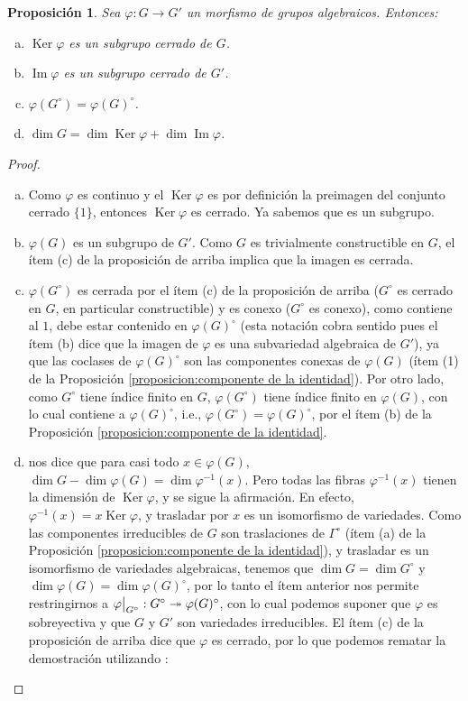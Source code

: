 \documentclass[spanish,10pt]{amsart}
\newcommand{\G}{\Gamma}
\newtheorem{proposition}[theorem]{Proposición}
\theoremstyle{definition}
\theoremstyle{remark}
\numberwithin{equation}{section}
\newcommand{\Imagen}{\operatorname{Im}}
\newcommand{\Ker}{\operatorname{Ker}}
\newcommand\rest[2]{{%
  \left.\kern-\nulldelimiterspace %
  #1 %
  \vphantom{\big|} %
  \right|_{#2} %
  }}
\begin{document}
\begin{proposition}\label{proposition:la imagen de un morfismo de grupos algebraicos es cerrado}
Sea $\varphi : G \to G'$ un morfismo de grupos algebraicos. Entonces:
\begin{enumerate}[(a)]
\item $\Ker \varphi$ es un subgrupo cerrado de $G$.
\item $\Imagen \varphi$ es un subgrupo cerrado de $G'$.
\item $\varphi (G^\circ) = \varphi (G)^\circ$.
\item $\dim G = \dim \Ker \varphi + \dim \Imagen \varphi$.
\end{enumerate}
\end{proposition}
\begin{proof}
\begin{enumerate}[(a)]
\item Como $\varphi$ es continuo y el $\Ker \varphi$ es por definición la preimagen del conjunto cerrado $\{1\}$, entonces $\Ker \varphi$ es cerrado. Ya sabemos que es un subgrupo.
\item $\varphi (G)$ es un subgrupo de $G'$. Como $G$ es trivialmente constructible en $G$, el ítem (c) de la proposición de arriba implica que la imagen es cerrada.
\item $\varphi (G^\circ)$ es cerrada por el ítem (c) de la proposición de arriba ($G^\circ$ es cerrado en $G$, en particular constructible) y es conexo ($G^\circ$ es conexo), como contiene al $1$, debe estar contenido en $\varphi (G)^\circ$ (esta notación cobra sentido pues el ítem (b) dice que la imagen de $\varphi$ es una subvariedad algebraica de $G'$), ya que las coclases de $\varphi (G)^\circ$ son las componentes conexas de $\varphi (G)$ (ítem (1) de la Proposición \ref{proposicion:componente de la identidad}). Por otro lado, como $G^\circ$ tiene índice finito en $G$, $\varphi (G^\circ)$ tiene índice finito en $\varphi (G)$, con lo cual contiene a $\varphi (G)^\circ$, i.e., $\varphi (G^\circ) = \varphi (G)^\circ$, por el ítem (b) de la Proposición \ref{proposicion:componente de la identidad}.
\item \cite[Ítem (2) del Teorema 2.12.9.]{notas_pedro} nos dice que para casi todo $x \in \varphi (G)$, $\dim G - \dim \varphi (G) = \dim \varphi^{-1} (x)$. Pero todas las fibras $\varphi^{-1} (x)$ tienen la dimensión de $\Ker \varphi$, y se sigue la afirmación. En efecto, $\varphi^{-1} (x) = x \Ker \varphi $, y trasladar por $x$ es un isomorfismo de variedades. Como las componentes irreducibles de $G$ son traslaciones de $\G^\circ$ (ítem (a) de la Proposición \ref{proposicion:componente de la identidad}), y trasladar es un isomorfismo de variedades algebraicas, tenemos que $\dim G = \dim G^\circ$ y $\dim \varphi (G) = \dim \varphi (G)^\circ$, por lo tanto el ítem anterior nos permite restringirnos a $\rest \varphi {G^\circ} : G^\circ \twoheadrightarrow \varphi (G)^\circ$, con lo cual podemos suponer que $\varphi$ es sobreyectiva y que $G$ y $G'$ son variedades irreducibles. El ítem (c) de la proposición de arriba dice que $\varphi$ es cerrado, por lo que podemos rematar la demostración utilizando \cite[Teorema 2.12.13.]{notas_pedro}:

\end{enumerate}
\end{proof}
\end{document}
